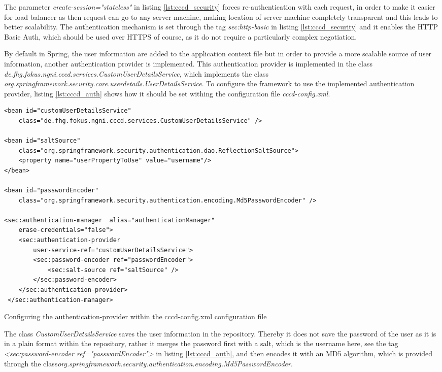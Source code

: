 The parameter \textit{create-session="stateless"} in listing \ref{lst:cccd_security} forces re-authentication with each request, in order to make it easier for load balancer as then request can go to any server machine, making location of server machine completely transparent and this leads to better scalability. The authentication mechanism is set through the tag \textit{sec:http-basic} in listing \ref{lst:cccd_security} and it enables the \ac{HTTP} Basic Auth, which should be used over \ac{HTTPS} of course, as it do not require a particularly complex negotiation.

By default in Spring, the user information are added to the application context file but in order to provide a more scalable source of user information, another authentication provider is implemented. This authentication provider is implemented in the class \textit{de.fhg.fokus.ngni.cccd.services.CustomUserDetailsService}, which implements the class  \textit{org.springframework.security.core.userdetails.UserDetailsService}. To configure the framework to use the implemented authentication provider, listing \ref{lst:cccd_auth} shows how it should be set withing the configuration file \textit{cccd-config.xml}.

\begin{code}
\begin{verbatim}
<bean id="customUserDetailsService" 
	class="de.fhg.fokus.ngni.cccd.services.CustomUserDetailsService" />

<bean id="saltSource" 
	class="org.springframework.security.authentication.dao.ReflectionSaltSource">
	<property name="userPropertyToUse" value="username"/>
</bean>

<bean id="passwordEncoder" 
	class="org.springframework.security.authentication.encoding.Md5PasswordEncoder" />

<sec:authentication-manager  alias="authenticationManager" 
	erase-credentials="false">
	<sec:authentication-provider 
		user-service-ref="customUserDetailsService">
 		<sec:password-encoder ref="passwordEncoder">
 			<sec:salt-source ref="saltSource" />
 		</sec:password-encoder>
 	</sec:authentication-provider>
 </sec:authentication-manager>
\end{verbatim}
\caption{Configuring the authentication-provider within the cccd-config.xml configuration file}
\label{lst:cccd_auth}
\end{code}

The class \textit{CustomUserDetailsService} saves the user information in the repository. Thereby it does not save the password of the user as it is in a plain format within the repository, rather it merges the password first with a salt, which is the username here, see the tag \textit{<sec:password-encoder ref="passwordEncoder">} in listing \ref{lst:cccd_auth}, and then encodes it with an MD5 algorithm, which is provided through the class\textit{org.springframework.security.authentication.encoding.Md5PasswordEncoder}.

